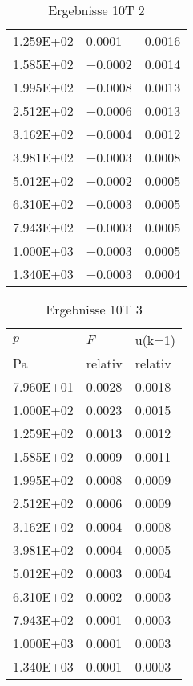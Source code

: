 \begin{table}
\begin{tabular}{l l l }
\num{1.259E+02}&\num{0.0001}&\num{0.0016}\\
\num{1.585E+02}&\num{-0.0002}&\num{0.0014}\\
\num{1.995E+02}&\num{-0.0008}&\num{0.0013}\\
\num{2.512E+02}&\num{-0.0006}&\num{0.0013}\\
\num{3.162E+02}&\num{-0.0004}&\num{0.0012}\\
\num{3.981E+02}&\num{-0.0003}&\num{0.0008}\\
\num{5.012E+02}&\num{-0.0002}&\num{0.0005}\\
\num{6.310E+02}&\num{-0.0003}&\num{0.0005}\\
\num{7.943E+02}&\num{-0.0003}&\num{0.0005}\\
\num{1.000E+03}&\num{-0.0003}&\num{0.0005}\\
\num{1.340E+03}&\num{-0.0003}&\num{0.0004}\\
\bottomrule
\end{tabular}\caption{Ergebnisse 10T 2}\end{table}\begin{table}\begin{tabular}{l l l }
\toprule
$p$&$F$&u(k=1)\\
 Pa & relativ & relativ\\\midrule
\num{7.960E+01}&\num{0.0028}&\num{0.0018}\\
\num{1.000E+02}&\num{0.0023}&\num{0.0015}\\
\num{1.259E+02}&\num{0.0013}&\num{0.0012}\\
\num{1.585E+02}&\num{0.0009}&\num{0.0011}\\
\num{1.995E+02}&\num{0.0008}&\num{0.0009}\\
\num{2.512E+02}&\num{0.0006}&\num{0.0009}\\
\num{3.162E+02}&\num{0.0004}&\num{0.0008}\\
\num{3.981E+02}&\num{0.0004}&\num{0.0005}\\
\num{5.012E+02}&\num{0.0003}&\num{0.0004}\\
\num{6.310E+02}&\num{0.0002}&\num{0.0003}\\
\num{7.943E+02}&\num{0.0001}&\num{0.0003}\\
\num{1.000E+03}&\num{0.0001}&\num{0.0003}\\
\num{1.340E+03}&\num{0.0001}&\num{0.0003}\\
\bottomrule
\end{tabular}\caption{Ergebnisse 10T 3}\end{table}\begin{table}\begin{tabular}{l l l }

\end{tabular}
\end{table}
